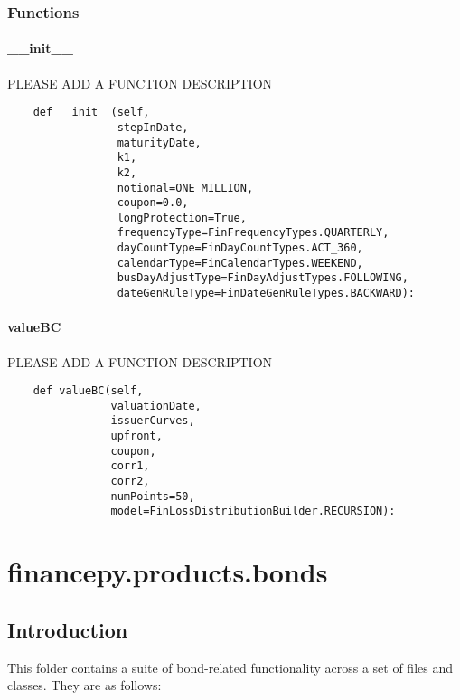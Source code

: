 \documentclass[twoside,11pt]{book}
\begin{document}
\subsection*{Functions}

\subsubsection*{{\bf \_\_init\_\_}}
PLEASE ADD A FUNCTION DESCRIPTION

\begin{lstlisting}
    def __init__(self,
                 stepInDate,
                 maturityDate,
                 k1,
                 k2,
                 notional=ONE_MILLION,
                 coupon=0.0,
                 longProtection=True,
                 frequencyType=FinFrequencyTypes.QUARTERLY,
                 dayCountType=FinDayCountTypes.ACT_360,
                 calendarType=FinCalendarTypes.WEEKEND,
                 busDayAdjustType=FinDayAdjustTypes.FOLLOWING,
                 dateGenRuleType=FinDateGenRuleTypes.BACKWARD):
\end{lstlisting}

\subsubsection*{{\bf valueBC}}
PLEASE ADD A FUNCTION DESCRIPTION

\begin{lstlisting}
    def valueBC(self,
                valuationDate,
                issuerCurves,
                upfront,
                coupon,
                corr1,
                corr2,
                numPoints=50,
                model=FinLossDistributionBuilder.RECURSION):
\end{lstlisting}


\chapter{financepy.products.bonds}
\section{Introduction}

This folder contains a suite of bond-related functionality across a set of files and classes. They are as follows:
\end{document}
